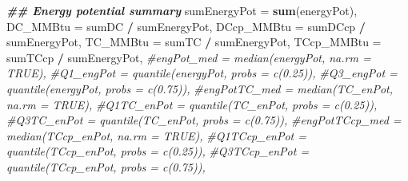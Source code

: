 \documentclass[
]{article}
\newenvironment{Shaded}{\begin{snugshade}}{\end{snugshade}}
\newcommand{\AttributeTok}[1]{\textcolor[rgb]{0.13,0.29,0.53}{#1}}
\newcommand{\CommentTok}[1]{\textcolor[rgb]{0.56,0.35,0.01}{\textit{#1}}}
\newcommand{\DocumentationTok}[1]{\textcolor[rgb]{0.56,0.35,0.01}{\textbf{\textit{#1}}}}
\newcommand{\FunctionTok}[1]{\textcolor[rgb]{0.13,0.29,0.53}{\textbf{#1}}}
\newcommand{\NormalTok}[1]{#1}
\newcommand{\SpecialCharTok}[1]{\textcolor[rgb]{0.81,0.36,0.00}{\textbf{#1}}}
\begin{document}
\begin{Shaded}
\begin{Highlighting}[]
            \DocumentationTok{\#\# Energy potential summary}
            \AttributeTok{sumEnergyPot =} \FunctionTok{sum}\NormalTok{(energyPot),}
            \AttributeTok{DC\_MMBtu =}\NormalTok{ sumDC }\SpecialCharTok{/}\NormalTok{ sumEnergyPot,}
            \AttributeTok{DCcp\_MMBtu =}\NormalTok{ sumDCcp }\SpecialCharTok{/}\NormalTok{ sumEnergyPot,}
            \AttributeTok{TC\_MMBtu =}\NormalTok{ sumTC }\SpecialCharTok{/}\NormalTok{ sumEnergyPot,}
            \AttributeTok{TCcp\_MMBtu =}\NormalTok{ sumTCcp }\SpecialCharTok{/}\NormalTok{ sumEnergyPot,}
            \CommentTok{\#engPot\_med = median(energyPot, na.rm = TRUE),}
            \CommentTok{\#Q1\_engPot = quantile(energyPot, probs = c(0.25)),}
            \CommentTok{\#Q3\_engPot = quantile(energyPot, probs = c(0.75)),}
            \CommentTok{\#engPotTC\_med = median(TC\_enPot, na.rm = TRUE),}
            \CommentTok{\#Q1TC\_enPot = quantile(TC\_enPot, probs = c(0.25)),}
            \CommentTok{\#Q3TC\_enPot = quantile(TC\_enPot, probs = c(0.75)),}
            \CommentTok{\#engPotTCcp\_med = median(TCcp\_enPot, na.rm = TRUE),}
            \CommentTok{\#Q1TCcp\_enPot = quantile(TCcp\_enPot, probs = c(0.25)),}
            \CommentTok{\#Q3TCcp\_enPot = quantile(TCcp\_enPot, probs = c(0.75)),}
            

\end{Highlighting}
\end{Shaded}
\end{document}
